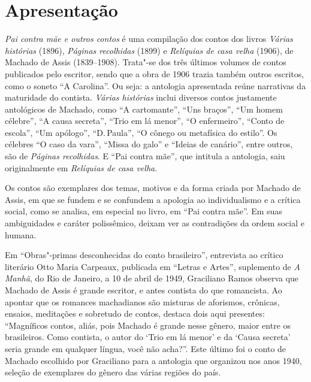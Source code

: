\chapter{Apresentação}

\emph{Pai contra mãe e outros contos} é uma compilação dos
contos dos livros \emph{Várias histórias} (1896), \emph{Páginas
recolhidas} (1899) e \emph{Relíquias de casa velha} (1906), de Machado
de Assis (1839--1908). Trata"-se dos três últimos volumes de contos
publicados pelo escritor, sendo que a obra de 1906 trazia também outros
escritos, como o soneto ``A Carolina''. Ou seja: a antologia apresentada
reúne narrativas da maturidade do contista. \emph{Várias histórias}
inclui diversos contos justamente antológicos de Machado, como ``A
cartomante'', ``Uns braços'', ``Um homem célebre'', ``A causa secreta'',
``Trio em lá menor'', ``O enfermeiro'', ``Conto de escola'', ``Um
apólogo'', ``D.\,Paula'', ``O cônego ou metafísica do estilo''. Os
célebres ``O caso da vara'', ``Missa do galo'' e ``Ideias de canário'',
entre outros, são de \emph{Páginas recolhidas}. E ``Pai contra mãe'',
que intitula a antologia, saiu originalmente em \emph{Relíquias de casa
velha}.

Os contos são exemplares dos temas, motivos e da forma criada por
Machado de Assis, em que se fundem e se confundem a apologia ao
individualismo e a crítica social, como se analisa, em especial no
livro, em ``Pai contra mãe''. Em suas ambiguidades e caráter
polissêmico, deixam ver as contradições da ordem social e humana.

Em ``Obras"-primas desconhecidas do conto brasileiro'', entrevista ao
crítico literário Otto Maria Carpeaux, publicada em ``Letras e Artes'',
suplemento de \emph{A Manhã}, do Rio de Janeiro, a 10 de abril de 1949,
Graciliano Ramos observa que Machado de Assis é grande escritor, e antes
contista do que romancista. Ao apontar que os romances machadianos são
misturas de aforismos, crônicas, ensaios, meditações e sobretudo de
contos, destaca dois aqui presentes: ``Magníficos contos, aliás, pois
Machado é grande nesse gênero, maior entre os brasileiros. Como
contista, o autor do `Trio em lá menor' e da `Causa secreta' seria
grande em qualquer língua, você não acha?''. Este último foi o conto de
Machado escolhido por Graciliano para a antologia que organizou nos anos
1940, seleção de exemplares do gênero das várias regiões do país.

